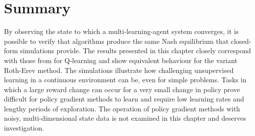 \section{Summary}
By observing the state to which a multi-learning-agent system converges, it is
possible to verify that algorithms produce the same Nash equilibrium that
closed-form simulations provide.  The results presented in this chapter closely
correspond with those from  for Q-learning and show
equivalent behaviour for the variant Roth-Erev method.  The simulations
illustrate how challenging unsupervised learning in a continuous environment can
be, even for simple problems. Tasks in which a large reward change can occur for
a very small change in policy prove difficult for policy gradient methods to
learn and require low learning rates and lengthy periods of exploration.  The
operation of policy gradient methods with noisy, multi-dimensional state data
is not examined in this chapter and deserves investigation.

%



